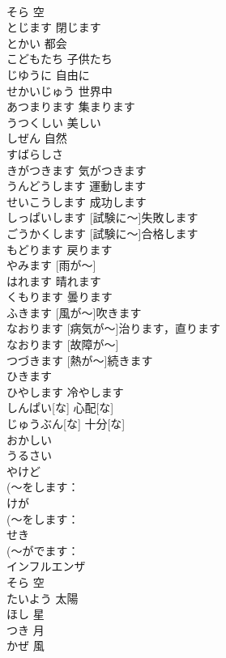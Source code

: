 \documentclass[8pt]{extreport}
\begin{document}
\begin{CJK}{UTF8}{min}
\\	そら	空	
\\	とじます	閉じます	
\\	とかい	都会	
\\	こどもたち	子供たち	
\\	じゆうに	自由に	
\\	せかいじゅう	世界中	
\\	あつまります	集まります	
\\	うつくしい	美しい	
\\	しぜん	自然	
\\	すばらしさ			
\\	きがつきます	気がつきます	
\\	うんどうします	運動します	
\\	せいこうします	成功します	
\\	[しけんに～]しっぱいします	[試験に～]失敗します	
\\	[しけんに～]ごうかくします	[試験に～]合格します	
\\	もどります	戻ります	
\\	[あめが～] やみます	[雨が～]	
\\	はれます	晴れます	
\\	くもります	曇ります	
\\	[かぜが～]ふきます	[風が～]吹きます	
\\	[びょうきが～]なおります	[病気が～]治ります，直ります	
\\	[こしょうが～]なおります	[故障が～]	
\\	[ねつが～]つづきます	[熱が～]続きます	
\\	[かぜを～]ひきます			
\\	ひやします	冷やします	
\\	しんぱい[な]	心配[な]	
\\	じゅうぶん[な]	十分[な]	
\\	おかしい			
\\	うるさい			
\\	やけど			
\\	(～をします：
\\	けが			
\\	(～をします：
\\	せき			
\\	(～がでます：
\\	インフルエンザ			
\\	そら	空	
\\	たいよう	太陽	
\\	ほし	星	
\\	つき	月	
\\	かぜ	風	

\end{CJK}
\end{document}
